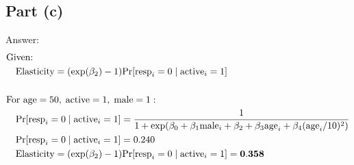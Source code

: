 \documentclass[12pt, a4paper]{article}
\begin{document}
\subsection*{Part (c)}
Answer:
\begin{align*}
    &\text{Given: }\\
    &\quad\text{Elasticity} = (\text{exp}(\beta_2)-1)\text{Pr}[\text{resp}_i = 0\;|\;\text{active}_i=1]\\\\
    &\text{For age}=50,\;\text{active}=1,\;\text{male}=1:\\
    &\quad\text{Pr}[\text{resp}_i = 0\;|\;\text{active}_i=1] = \frac{1}{1+\text{exp}(\beta_0 + \beta_1\text{male}_i+\beta_2+\beta_3\text{age}_i+\beta_4(\text{age}_i/10)^2)}\\
    &\quad\text{Pr}[\text{resp}_i = 0\;|\;\text{active}_i=1] =  0.240\\
    &\quad\text{Elasticity} =(\text{exp}(\beta_2)-1)\text{Pr}[\text{resp}_i = 0\;|\;\text{active}_i=1] = \bf 0.358\\\\
\end{align*}
\vspace{1em}
\end{document}
